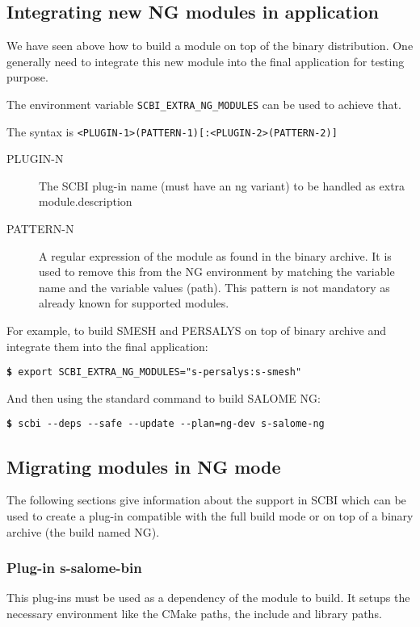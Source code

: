 \documentclass[a4paper,12pt,twoside]{article}
\newcommand{\code}[1]{\texttt{#1}}
\newcommand{\cmd}[1]{\tabto{1cm}\hspace{0.5cm}\texttt{\textbf{\$} #1}}
\newcommand{\ddash}{-{}-}
\begin{document}
\subsection{Integrating new NG modules in application}

We have seen above how to build a module on top of the binary distribution. One generally need to integrate this new module into the final application for testing purpose.

The environment variable \code{SCBI\_EXTRA\_NG\_MODULES} can be used to achieve that.

The syntax is \code{<PLUGIN-1>(PATTERN-1)[:<PLUGIN-2>(PATTERN-2)]}

\begin{description}
	\item[PLUGIN-N] The SCBI plug-in name (must have an ng variant) to be handled as extra module.description
	\item[PATTERN-N] A regular expression of the module as found in the binary archive. It is used to remove this from the NG environment by matching the variable name and the variable values (path). This pattern is not mandatory as already known for supported modules.
\end{description}

For example, to build SMESH and PERSALYS on top of binary archive and integrate them into the final application:

\cmd{export SCBI\_EXTRA\_NG\_MODULES="s-persalys:s-smesh"}

And then using the standard command to build SALOME NG:

\cmd{scbi \ddash{}deps \ddash{}safe \ddash{}update \ddash{}plan=ng-dev s-salome-ng}

\subsection{Migrating modules in NG mode}
\label{migrateng}

The following sections give information about the support in SCBI which can be used to create a plug-in compatible with the full build mode or on top of a binary archive (the build named NG).

\subsubsection{Plug-in s-salome-bin}
\label{pg:salbin}

This plug-ins must be used as a dependency of the module to build. It setups the necessary environment like the CMake paths, the include and library paths.
\end{document}
